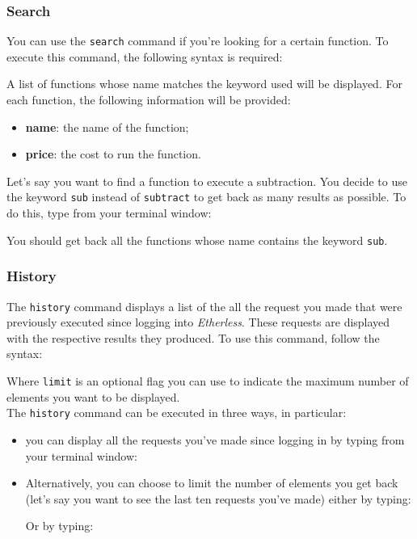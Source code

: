 \subsubsection{Search}
You can use the \texttt{search} command if you're looking for a certain function. To execute this command, the following syntax is required:
\begin{center}
\end{center}

A list of functions whose name matches the keyword used will be displayed. For each function, the following information will be provided:
\begin{itemize}
	\item \textbf{name}: the name of the function;
	\item \textbf{price}: the cost to run the function.
\end{itemize}
Let's say you want to find a function to execute a subtraction. You decide to use the keyword \texttt{sub} instead of \texttt{subtract} to get back as many results as possible. To do this, type from your terminal window:
\begin{center}
\end{center}
You should get back all the functions whose name contains the keyword \texttt{sub}.

\subsubsection{History}
The \texttt{history} command displays a list of the all the request you made that were previously executed since logging into \textit{Etherless}. These requests are displayed with the respective results they produced. To use this command, follow the syntax:
\begin{center}
\end{center}
Where \texttt{limit} is an optional flag you can use to indicate the maximum number of elements you want to be displayed. \\
The \texttt{history} command can be executed in three ways, in particular:
\begin{itemize}
\item you can display all the requests you've made since logging in by typing from your terminal window:
\begin{center}
\end{center}
\item Alternatively, you can choose to limit the number of elements you get back (let's say you want to see the last ten requests you've made) either by typing:
\begin{center}
\end{center}
Or by typing:
\begin{center}
\end{center}
\end{itemize}

